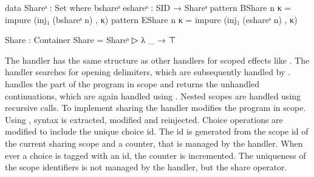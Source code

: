 \begin{code}
data Shareˢ : Set where bshareˢ eshareˢ : SID → Shareˢ
pattern BShare  n κ = impure (inj₁ (bshareˢ n)  , κ)
pattern EShare  n κ = impure (inj₁ (eshareˢ n)  , κ)

Share : Container
Share = Shareˢ ▷ λ _ → ⊤
\end{code}
The handler has the same structure as other handlers for scoped effects like
.
The  handler searches for opening delimiters, which are
subsequently handled by .
 handles the part of the program in scope and returns the
unhandled continuations, which are again handled using .
Nested scopes are handled using recursive  calls.
To implement sharing the handler modifies the program in scope.
Using ,  syntax is extracted, modified and
reinjected.
Choice operations are modified to include the unique choice id.
The id is generated from the scope id of the current sharing scope and a
counter, that is managed by the handler.
When ever a choice is tagged with an id, the counter is incremented.
The uniqueness of the scope identifiers is not managed by the handler, but the
share operator.

